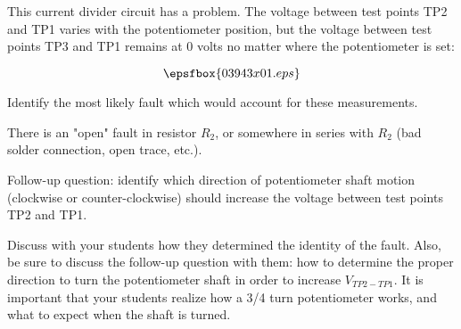 

This current divider circuit has a problem.  The voltage between test points TP2 and TP1 varies with the potentiometer position, but the voltage between test points TP3 and TP1 remains at 0 volts no matter where the potentiometer is set:

$$\epsfbox{03943x01.eps}$$

Identify the most likely fault which would account for these measurements.







There is an "open" fault in resistor $R_2$, or somewhere in series with $R_2$ (bad solder connection, open trace, etc.).

\vskip 10pt

Follow-up question: identify which direction of potentiometer shaft motion (clockwise or counter-clockwise) should increase the voltage between test points TP2 and TP1.







Discuss with your students how they determined the identity of the fault.  Also, be sure to discuss the follow-up question with them: how to determine the proper direction to turn the potentiometer shaft in order to increase $V_{TP2-TP1}$.  It is important that your students realize how a 3/4 turn potentiometer works, and what to expect when the shaft is turned.




